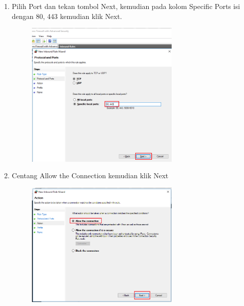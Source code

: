 \begin{enumerate}
	\item Pilih Port dan tekan tombol Next, kemudian pada kolom Specific Ports isi dengan 80, 443 kemudian klik Next.
		\begin{figure}[!htbp]
    		\centering
    		\includegraphics[width=0.7\textwidth]{figures/XAMPP/Xampp16.png}
    		\label{Xampp16}
		\end{figure}
		
	\item Centang Allow the Connection kemudian klik Next
		\begin{figure}[!htbp]
    		\centering
    		\includegraphics[width=0.7\textwidth]{figures/XAMPP/Xampp17.png}
    		\label{Xampp17}
		\end{figure}
		

\end{enumerate}
